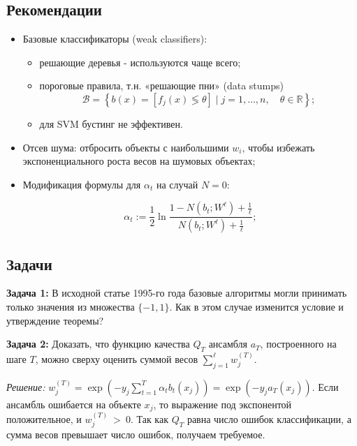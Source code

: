     \subsection*{Рекомендации}
    \begin{itemize}
    	\item Базовые классификаторы (weak classifiers):
    		\begin{itemize}
    			\item решающие деревья - используются чаще всего;
    			\item пороговые правила, т.н. «решающие пни» (data stumps)
    			\begin{equation*}
    				\mathscr{B}=\left\{b(x)=\left[f_j(x) \lessgtr \theta\right] \mid j=1, \ldots, n,\quad \theta \in \mathbb{R}\right\};
    			\end{equation*}
    			\item для SVM бустинг не эффективен.
    		\end{itemize}
    	\item Отсев шума: отбросить объекты с наибольшими $w_i$, чтобы избежать экспоненциального роста весов на шумовых объектах;
    	\item Модификация формулы для $\alpha_t$ на случай $N=0$:
    	
    	\begin{equation*}
    		\alpha_t:=\frac{1}{2} \ln \frac{1-N\left(b_t ; W^{\ell}\right)+\frac{1}{\ell}}{N\left(b_t ; W^{\ell}\right)+\frac{1}{\ell}} ;
    	\end{equation*}
    \end{itemize}

    \subsection*{Задачи}
    \textbf{Задача 1:} В исходной статье 1995-го года базовые алгоритмы могли принимать только значения из множества $\{-1, 1\}$. Как в этом случае изменится условие и утверждение теоремы?
    
    \textbf{Задача 2:} Доказать, что функцию качества $Q_{T}$ ансамбля $a_{T}$, построенного на шаге $T$, можно сверху оценить суммой весов $\sum_{j=1}^\ell w_j^{(T)}$.
    
    \textit{Решение:} $w_j^{(T)}={\exp \left(-y_j \sum_{t=1}^{T} \alpha_t b_t\left(x_j\right)\right)}={\exp \left(-y_j a_T\left(x_j\right)\right)}$. Если ансамбль ошибается на объекте $x_j$, то выражение под экспонентой положительное, и $w_j^{(T)}~>~0$. Так как $Q_T$ равна число ошибок классификации, а сумма весов превышает число ошибок, получаем требуемое.
    
